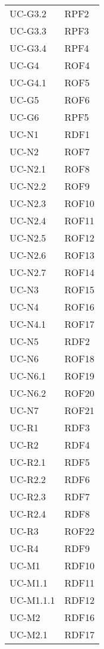 \begin{longtable}{| p{5cm} | p{5cm} |}
		UC-G3.2 & RPF2 \\
		\rowcolor{LightGray}
		UC-G3.3 & RPF3 \\
		UC-G3.4 & RPF4 \\
		\rowcolor{LightGray}
		UC-G4 & ROF4 \\
		UC-G4.1 & ROF5 \\
		\rowcolor{LightGray}
		UC-G5 & ROF6 \\
		UC-G6 & RPF5\\
		\rowcolor{LightGray}
		UC-N1 & RDF1\\
		UC-N2 & ROF7  \\
		\rowcolor{LightGray}
		UC-N2.1 & ROF8 \\
		UC-N2.2 & ROF9 \\
		\rowcolor{LightGray}
		UC-N2.3 & ROF10 \\
		UC-N2.4 & ROF11 \\
		\rowcolor{LightGray}
		UC-N2.5 & ROF12 \\
		UC-N2.6 & ROF13 \\
		\rowcolor{LightGray}
		UC-N2.7 & ROF14 \\	
		UC-N3 & ROF15\\	
		\rowcolor{LightGray}
		UC-N4 & ROF16\\
		UC-N4.1 & ROF17\\
		\rowcolor{LightGray}
		UC-N5 & RDF2 \\
		UC-N6 & ROF18 \\
		\rowcolor{LightGray}
		UC-N6.1 & ROF19 \\
		UC-N6.2 & ROF20 \\
		\rowcolor{LightGray}
		UC-N7 & ROF21\\
		UC-R1 & RDF3 \\
		\rowcolor{LightGray}
		UC-R2 & RDF4 \\
		UC-R2.1 & RDF5 \\
		\rowcolor{LightGray}
		UC-R2.2 & RDF6 \\
		UC-R2.3 & RDF7 \\
		\rowcolor{LightGray}
		UC-R2.4 & RDF8 \\
		UC-R3 & ROF22\\
		\rowcolor{LightGray}
		UC-R4 & RDF9 \\
		UC-M1 & RDF10 \\
		\rowcolor{LightGray}
		UC-M1.1 & RDF11\\
		UC-M1.1.1 & RDF12\\
		\rowcolor{LightGray}
		UC-M2 & RDF16 \\
		\rowcolor{LightGray}
		UC-M2.1 & RDF17 \\

\end{longtable}
